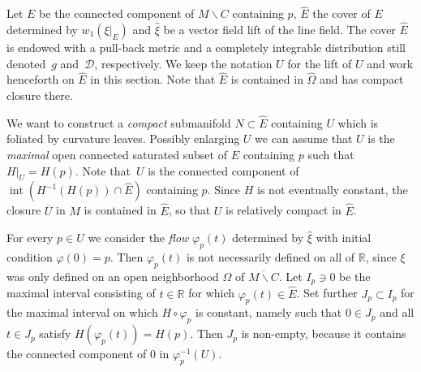 \documentclass[10pt]{amsart}
\let\mathcal\mathscr
\let\moins\smallsetminus
\DeclareMathOperator{\inte}{int}
\theoremstyle{definition}
\theoremstyle{remark}
\numberwithin{equation}{section}
\newcommand{\RR}{\mathbb R}
\begin{document}
Let $E$ be the connected component of $M\moins C$ containing $p$,
$\widehat{E}$ the cover of $E$ determined by $w_1(\xi|_E)$
and $\widehat{\xi}$ be a vector field lift of the line field.
The cover $\widehat{E}$ is endowed with a pull-back metric and a
completely integrable distribution still denoted~$g$ and~$\mathcal D$, respectively. We keep the notation $U$ for the lift of $U$ and work henceforth on $\widehat{E}$ in this section.
Note that $\widehat{E}$ is contained in $\widehat{\Omega}$ and has compact closure there.

We want to construct a \emph{compact} submanifold $N\subset \widehat{E}$
containing $U$ which is foliated by curvature leaves.
Possibly enlarging $U$ we can assume that $U$ is the
\emph{maximal} open connected saturated subset of $E$ containing $p$
such that $H|_{U}=H(p)$. Note that~$U$ is the connected component
of $\inte (H^{-1}(H(p))\cap \widehat{E})$ containing $p$. Since $H$ is not eventually constant, the closure
$\overline{U}$ in $M$ is contained in $\widehat{E}$, so that $U$ is relatively compact in $\widehat{E}$.

For every $p\in U$ we consider the \emph{flow} $\varphi_p(t)$ determined by $\widehat{\xi}$ with initial condition
$\varphi(0)=p$. Then $\varphi_p(t)$ is not necessarily defined on all of $\RR$, since
$\xi$ was only defined on an open neighborhood $\Omega$ of $\overline{M\moins C}$.
Let $I_p\ni 0$ be the maximal interval consisting of $t\in \RR$ for which $\varphi_p(t)\in \widehat{E}$.
Set further $J_p\subset I_p$ for the maximal interval on which $H\circ \varphi_p$ is constant, namely such that $0\in J_p$ and
all $t\in J_p$ satisfy $H(\varphi_p(t))=H(p)$. Then $J_p$ is non-empty, because it contains
the connected component of $0$ in $\varphi_p^{-1}(U)$.
\end{document}

